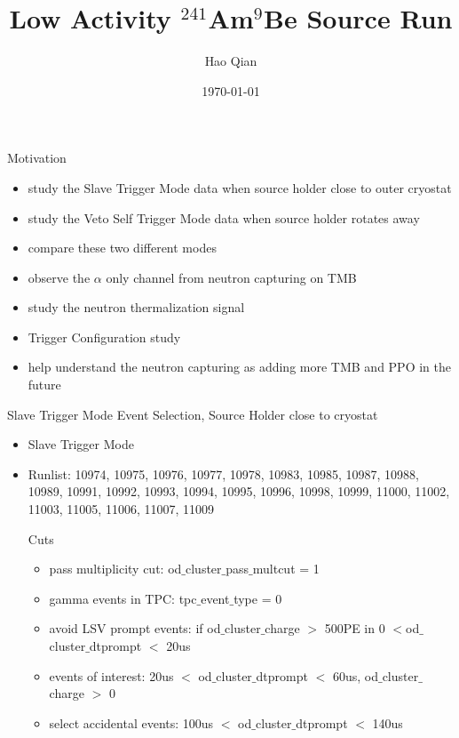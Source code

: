 \documentclass[9pt]{beamer}
\title{\Huge Low Activity $^{241}$Am$^9$Be Source Run}
\author{Hao Qian}
\institute{\it Princeton University}
\date{\today}
\begin{document}
\begin{frame}
\titlepage
\end{frame}

\begin{frame}{Motivation}
\begin{itemize}
[bullet]
\item study the Slave Trigger Mode data when source holder close to outer cryostat
\item study the Veto Self Trigger Mode data when source holder rotates away 
\item compare these two different modes
\item observe the $\alpha$ only channel from neutron capturing on TMB
\item study the neutron thermalization signal
\item Trigger Configuration study
\item help understand the neutron capturing as adding more TMB and PPO in the future
\end{itemize}
\end{frame}

\begin{frame}{Slave Trigger Mode Event Selection, Source Holder close to cryostat}
\begin{itemize}
[bullet]
\item Slave Trigger Mode
\item Runlist: 10974, 10975, 10976, 10977, 10978, 10983, 10985, 10987,
  10988, 10989, 10991, 10992, 10993, 10994, 10995, 10996, 10998, 10999,
  11000, 11002, 11003, 11005, 11006, 11007, 11009
\begin{exampleblock}{Cuts}
	\begin{itemize}
	[default]
	\item pass multiplicity cut: od$\_$cluster$\_$pass$\_$multcut = 1  
	\item gamma events in TPC: tpc$\_$event$\_$type = 0
        \item avoid LSV prompt events: if od$\_$cluster$\_$charge $>$ 500PE in 0 $<$od$\_$cluster$\_$dtprompt $<$ 20us
        \item events of interest:  20us $<$ od$\_$cluster$\_$dtprompt $<$ 60us, od$\_$cluster$\_$charge $>$ 0
        \item select accidental events: 100us $<$ od$\_$cluster$\_$dtprompt $<$ 140us
	\end{itemize}
\end{exampleblock}	
\end{itemize}
\end{frame}
\end{document}
